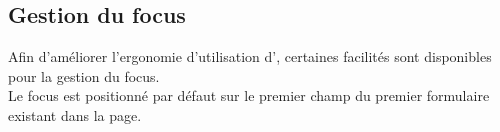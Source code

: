 

\subsection{Gestion du focus}

Afin d'améliorer l'ergonomie d'utilisation d'\obm, certaines facilités sont disponibles pour la gestion du focus.\\

Le focus est positionné par défaut sur le premier champ du premier formulaire existant dans la page.
